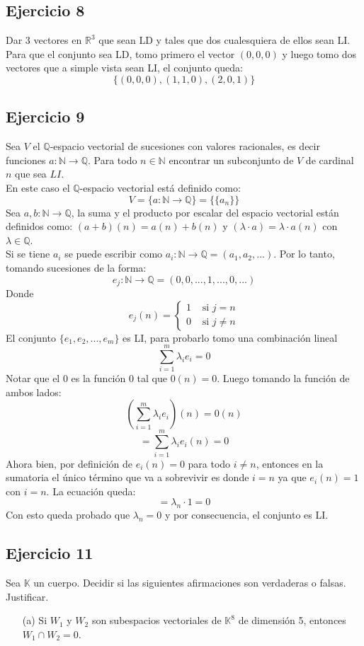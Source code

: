 \documentclass[a4paper,12pt]{article}
\begin{document}
\subsection{Ejercicio 8}
Dar 3 vectores en $\mathds{R}^3$ que sean LD y tales que dos cualesquiera de ellos sean LI. \\
Para que el conjunto sea LD, tomo primero el vector $(0,0,0)$ y luego tomo dos vectores que a simple vista sean LI, el conjunto queda: 
$$
\{ (0,0,0),(1,1,0), (2,0,1) \}
$$

\subsection{Ejercicio 9}
Sea $V$ el $\mathbb{Q}$-espacio vectorial de sucesiones con valores racionales, es decir funciones $a:\mathbb{N}\rightarrow\mathbb{Q}$. Para todo $n\in\mathbb{N}$ encontrar un subconjunto de $V$ de cardinal $n$ que sea $LI$. \\
En este caso el $\mathbb{Q}$-espacio vectorial está definido como: 
$$
V = \{  a:\mathds{N}\rightarrow\mathbb{Q} \}= \{ \{ a_n \} \}
$$
Sea $a,b:\mathds{N}\rightarrow\mathbb{Q}$, la suma y el producto por escalar del espacio vectorial están definidos como: $(a+b)(n)=a(n)+b(n)$ y $(\lambda \cdot a) = \lambda \cdot a(n)$ con $\lambda\in\mathbb{Q}$. \\
Si se tiene $a_i$ se puede escribir como $a_i:\mathds{N}\rightarrow\mathbb{Q}=(a_1,a_2,...)$. Por lo tanto, tomando sucesiones de la forma:
$$
e_j:\mathds{N}\rightarrow\mathbb{Q}=(0,0,...,1,...,0,...)
$$
Donde
$$
e_j(n)=\begin{cases}
1 & \text{ si } j=n \\ 
0 & \text{ si } j\neq n 
\end{cases}
$$
El conjunto $\{ e_1,e_2,...,e_m \}$ es LI, para probarlo tomo una combinación lineal
$$
\sum_{i=1}^{m}\lambda_ie_i=0
$$
Notar que el $0$ es la función 0 tal que $0(n)=0$. Luego tomando la función de ambos lados:
$$
\left ( \sum_{i=1}^{m}\lambda_ie_i\right )(n)=0 (n)
$$
$$
= \sum_{i=1}^{m}\lambda_ie_i(n)=0
$$
Ahora bien, por definición de $e_i(n)=0$ para todo $i\neq n$, entonces en la sumatoria el único término que va a sobrevivir es donde $i=n$ ya que $e_i(n)=1$ con $i=n$. La ecuación queda:
$$
= \lambda_n \cdot 1 = 0
$$
Con esto queda probado que $\lambda_n=0$ y por consecuencia, el conjunto es LI.
\subsection{Ejercicio 11}
Sea $\mathbb{K}$ un cuerpo. Decidir si las siguientes afirmaciones son verdaderas o falsas. Justificar.
\begin{itemize}
    \item[(a)] Si $W_1$ y $W_2$ son subespacios vectoriales de $\mathbb{K}^8$ de dimensión 5, entonces $W_1\cap W_2=0$.
\end{itemize}
\end{document}
